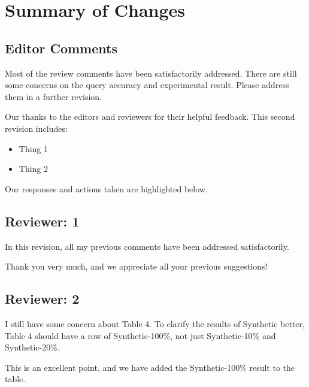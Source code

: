 \documentclass{article}
\begin{document}
\section*{Summary of Changes}\label{summary-of-changes}
\subsection*{Editor Comments}\label{editor-comments}

Most of the review comments have been satisfactorily addressed. There are still some concerns on the query accuracy and experimental result. Please address them in a further revision.

\begin{tcolorbox}
    Our thanks to the editors and reviewers for their helpful feedback. This second revision includes:

\begin{itemize}
\item Thing 1

\item Thing 2
\end{itemize}
%
Our responses and actions taken are highlighted below.
\end{tcolorbox}

\subsection*{Reviewer: 1}\label{reviewer-1}

In this revision, all my previous comments have been addressed satisfactorily.

\begin{tcolorbox}
    Thank you very much, and we appreciate all your previous suggestions!
\end{tcolorbox}

\subsection*{Reviewer: 2}\label{reviewer-2}

I still have some concern about Table 4. To clarify the results of Synthetic better, Table 4 should have a row of Synthetic-100\%, not just Synthetic-10\% and Synthetic-20\%.

\begin{tcolorbox}
    This is an excellent point, and we have added the Synthetic-100\% result to the table.
\end{tcolorbox}
\end{document}
